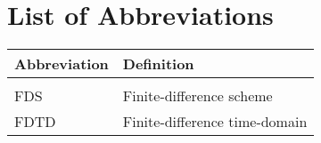 \chapter{List of Abbreviations}
{\centering\renewcommand{\arraystretch}{1.1}
\begin{longtable}{ p{3cm} p{8cm}}
 Abbreviation & Definition\\
 \hline\\
 \endhead
 FDS & Finite-difference scheme\\
 FDTD & Finite-difference time-domain
\end{longtable}}